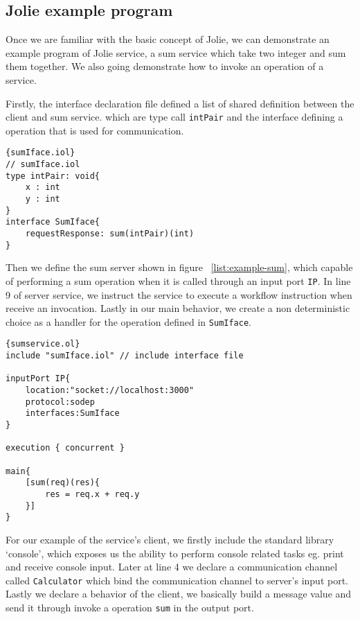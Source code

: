 \subsection{Jolie example program}

Once we are familiar with the basic concept of Jolie, we can demonstrate an example program of Jolie service, a sum service which take two integer and sum them together. We also going demonstrate how to invoke an operation of a service.

Firstly, the interface declaration file defined a list of shared definition between the client and sum service. which are type call \texttt{intPair} and the interface defining a operation that is used for communication.

\begin{listing}[ht]
    \lstset{language=Jolie,
        style=codeStyle
    }
    \begin{lstlisting}[frame=tlrb,caption={Sum service interface}, label={list:example-iol}]{sumIface.iol}
// sumIface.iol
type intPair: void{
    x : int
    y : int
}
interface SumIface{
    requestResponse: sum(intPair)(int)
}
\end{lstlisting}
\end{listing}

Then we define the sum server shown in figure ~\ref{list:example-sum}, which capable of performing a sum operation when it is called through an input port \texttt{IP}. In line 9 of server service, we instruct the service to execute a workflow instruction when receive an invocation. Lastly in our main behavior, we create a non deterministic choice as a handler for the operation defined in \texttt{SumIface}.

\begin{listing}
    \lstset{language=Jolie,
        style=codeStyle,
        numbers=left,
        firstnumber=1
    }
    \begin{lstlisting}[frame=tlrb, caption= {Sum service}, label={list:example-sum} ]{sumservice.ol}
include "sumIface.iol" // include interface file

inputPort IP{
    location:"socket://localhost:3000"
    protocol:sodep 
    interfaces:SumIface
}

execution { concurrent }

main{
    [sum(req)(res){
        res = req.x + req.y
    }]
}
\end{lstlisting}
\end{listing}

For our example of the service's client, we firstly include the standard library `console', which exposes us the ability to perform console related tasks eg. print and receive console input. Later at line 4 we declare a communication channel called \texttt{Calculator} which bind the communication channel to server's input port. Lastly we declare a behavior of the client, we basically build a message value and send it through invoke a operation \texttt{sum} in the output port.

